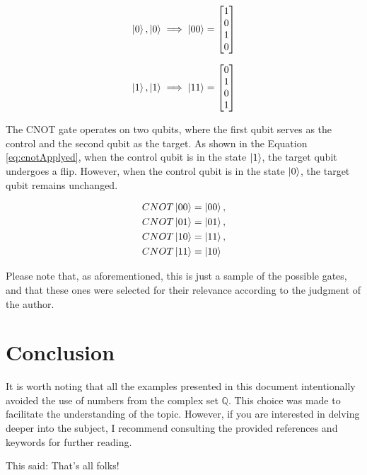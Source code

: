 			\begin{equation}
				\label{eq:ketForTwoVectors01}
				\ket{0}, \ket{0} \implies
				\ket{00} = \begin{bmatrix}
					1 \\
					0 \\
					1 \\
					0
				\end{bmatrix}				
			\end{equation}
			
			\begin{equation}
				\label{eq:ketForTwoVectors02}
				\ket{1}, \ket{1} \implies
				\ket{11} = \begin{bmatrix}
					0 \\
					1 \\
					0 \\
					1
				\end{bmatrix}				
			\end{equation}
			
			\par The CNOT gate operates on two qubits, where the first qubit serves as the control and the second qubit as the target. As shown in the Equation \ref{eq:cnotApplyed}, when the control qubit is in the state $\ket{1}$, the target qubit undergoes a flip. However, when the control qubit is in the state $\ket{0}$, the target qubit remains unchanged.
			
			\begin{equation}
				\label{eq:cnotApplyed}
				\begin{aligned}
					&CNOT\ket{00} = \ket{00}, \\
					&CNOT\ket{01} = \ket{01}, \\
					&CNOT\ket{10} = \ket{11}, \\
					&CNOT\ket{11} = \ket{10}
				\end{aligned}
			\end{equation}


			\par Please note that, as aforementioned, this is just a sample of the possible gates, and that these ones were selected for their relevance according to the judgment of the author.

	\section{Conclusion}
		\par It is worth noting that all the examples presented in this document intentionally avoided the use of numbers from the complex set $\mathbb{Q}$. This choice was made to facilitate the understanding of the topic. However, if you are interested in delving deeper into the subject, I recommend consulting the provided references and keywords for further reading.
		
		\par This said: That's all folks!	
	
	
